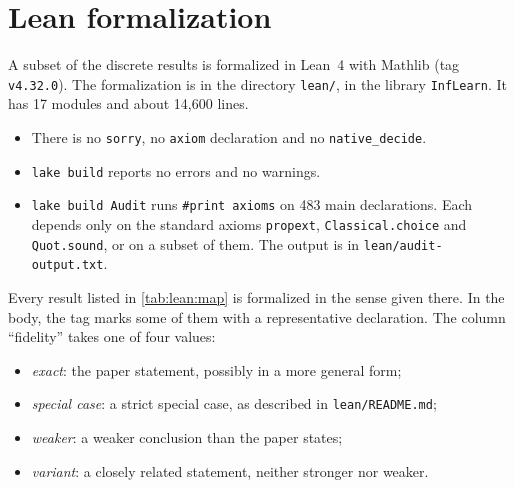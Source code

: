 \section{Lean formalization}\label{app:lean}

A subset of the discrete results is formalized in Lean~4 \citep{demoura2021lean4} with Mathlib \citep{mathlib2020} (tag \texttt{v4.32.0}). The formalization is in the directory \texttt{lean/}, in the library \texttt{InfLearn}. It has 17 modules and about 14{,}600 lines.
\begin{itemize}
\item There is no \texttt{sorry}, no \texttt{axiom} declaration and no \texttt{native\_decide}.
\item \texttt{lake build} reports no errors and no warnings.
\item \texttt{lake build Audit} runs \texttt{\#print axioms} on 483 main declarations. Each depends only on the standard axioms \texttt{propext}, \texttt{Classical.choice} and \texttt{Quot.sound}, or on a subset of them. The output is in \texttt{lean/audit-output.txt}.
\end{itemize}
Every result listed in \cref{tab:lean:map} is formalized in the sense given there. In the body, the tag \leanok{\dots} marks some of them with a representative declaration. The column ``fidelity'' takes one of four values:
\begin{itemize}
\item \emph{exact}: the paper statement, possibly in a more general form;
\item \emph{special case}: a strict special case, as described in \texttt{lean/README.md};
\item \emph{weaker}: a weaker conclusion than the paper states;
\item \emph{variant}: a closely related statement, neither stronger nor weaker.
\end{itemize}

